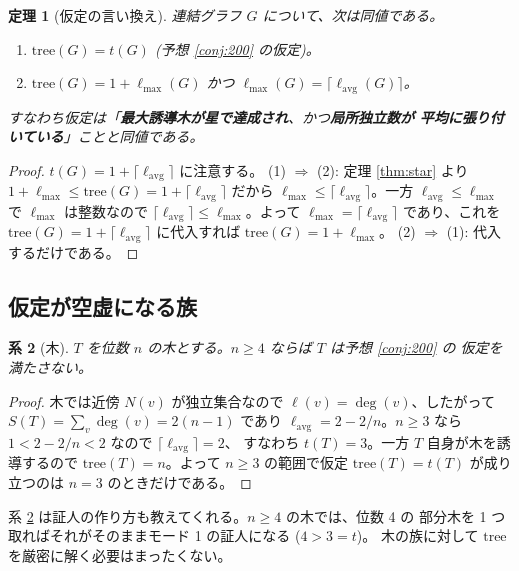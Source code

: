 \documentclass[paper=a4,fontsize=10.5pt,jafontsize=10.5pt]{jlreq}
\theoremstyle{plain}
\newtheorem{theorem}{定理}[section]
\newtheorem{corollary}[theorem]{系}
\theoremstyle{definition}
\begin{document}
\begin{theorem}[仮定の言い換え]\label{thm:reform}
連結グラフ $G$ について、次は同値である。
\begin{enumerate}
\item $\mathrm{tree}(G) = t(G)$ (予想 \ref{conj:200} の仮定)。
\item $\mathrm{tree}(G) = 1 + \ell_{\max}(G)$ かつ
      $\ell_{\max}(G) = \lceil \ell_{\mathrm{avg}}(G) \rceil$。
\end{enumerate}
すなわち仮定は「\textbf{最大誘導木が星で達成され}、かつ\textbf{局所独立数が
平均に張り付いている}」ことと同値である。
\end{theorem}

\begin{proof}
$t(G) = 1 + \lceil \ell_{\mathrm{avg}} \rceil$ に注意する。
(1) $\Rightarrow$ (2): 定理 \ref{thm:star} より
$1 + \ell_{\max} \le \mathrm{tree}(G) = 1 + \lceil \ell_{\mathrm{avg}} \rceil$
だから $\ell_{\max} \le \lceil \ell_{\mathrm{avg}} \rceil$。一方
$\ell_{\mathrm{avg}} \le \ell_{\max}$ で $\ell_{\max}$ は整数なので
$\lceil \ell_{\mathrm{avg}} \rceil \le \ell_{\max}$。よって
$\ell_{\max} = \lceil \ell_{\mathrm{avg}} \rceil$ であり、これを
$\mathrm{tree}(G) = 1 + \lceil \ell_{\mathrm{avg}} \rceil$ に代入すれば
$\mathrm{tree}(G) = 1 + \ell_{\max}$。
(2) $\Rightarrow$ (1): 代入するだけである。
\end{proof}

\subsection{仮定が空虚になる族}

\begin{corollary}[木]\label{cor:tree}
$T$ を位数 $n$ の木とする。$n \ge 4$ ならば $T$ は予想 \ref{conj:200} の
仮定を満たさない。
\end{corollary}

\begin{proof}
木では近傍 $N(v)$ が独立集合なので $\ell(v) = \deg(v)$、したがって
$S(T) = \sum_v \deg(v) = 2(n-1)$ であり
$\ell_{\mathrm{avg}} = 2 - 2/n$。$n \ge 3$ なら
$1 < 2 - 2/n < 2$ なので $\lceil \ell_{\mathrm{avg}} \rceil = 2$、
すなわち $t(T) = 3$。一方 $T$ 自身が木を誘導するので
$\mathrm{tree}(T) = n$。よって $n \ge 3$ の範囲で仮定
$\mathrm{tree}(T) = t(T)$ が成り立つのは $n = 3$ のときだけである。
\end{proof}

系 \ref{cor:tree} は証人の作り方も教えてくれる。$n \ge 4$ の木では、位数 4 の
部分木を 1 つ取ればそれがそのままモード 1 の証人になる ($4 > 3 = t$)。
木の族に対して $\mathrm{tree}$ を厳密に解く必要はまったくない。
\end{document}
